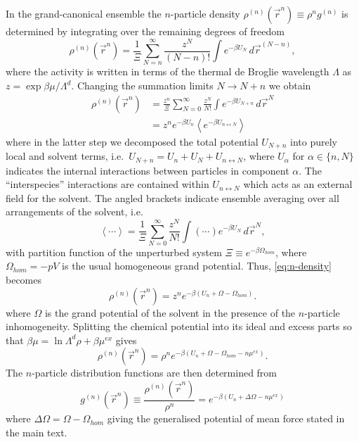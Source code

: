 \documentclass[12pt]{report}
\begin{document}
In the grand-canonical ensemble the $n$-particle density $\rho^{(n)}(\vec{r}^n) \equiv \rho^n g^{(n)}$ is determined by integrating over the remaining degrees of freedom~\cite{Hansen2013}
\begin{equation}
  \rho^{(n)}(\vec{r}^n)
  = \frac{1}{\Xi} \sum_{N=n}^\infty \frac{z^N}{(N-n)!} \int e^{-\beta U_N} \, d\vec{r}^{(N-n)},
\end{equation}
where the activity is written in terms of the thermal de Broglie wavelength $\Lambda$ as $z = \exp{\beta\mu} / \Lambda^d$.
Changing the summation limits $N \rightarrow N+n$ we obtain
\begin{equation}\label{eq:n-density}
\begin{aligned}
  \rho^{(n)}(\vec{r}^n)
  &= \frac{z^n}{\Xi} \sum_{N=0}^\infty \frac{z^N}{N!} \int e^{-\beta U_{N+n}} \, d\vec{r}^{N} \\
 & = z^n e^{-\beta U_n} \left< e^{-\beta U_{n \leftrightarrow N}} \right>
\end{aligned}
\end{equation}
where in the latter step we decomposed the total potential $U_{N+n}$ into purely local and solvent terms, i.e.\ $U_{N+n} = U_n + U_N + U_{n \leftrightarrow N}$, where $U_\alpha$ for $\alpha \in \{n,N\}$ indicates the internal interactions between particles in component $\alpha$.
The ``interspecies'' interactions are contained within $U_{n \leftrightarrow N}$ which acts as an external field for the solvent.
The angled brackets indicate ensemble averaging over all arrangements of the solvent, i.e.\
\begin{equation}
  \left< \cdots \right> =
  \frac{1}{\Xi} \sum_{N=0}^\infty \frac{z^N}{N!} \int \left(\cdots\right) e^{-\beta U_N} \, d\vec{r}^N,
\end{equation}
with partition function of the unperturbed system $\Xi \equiv e^{-\beta \Omega_{hom}}$, where $\Omega_{hom} = -p V$ is the usual homogeneous grand potential.
Thus, \eqref{eq:n-density} becomes
\begin{equation}
  \rho^{(n)}(\vec{r}^n)
  = z^n e^{-\beta (U_n + \Omega - \Omega_{hom})}.
\end{equation}
where $\Omega$ is the grand potential of the solvent in the presence of the $n$-particle inhomogeneity.
Splitting the chemical potential into its ideal and excess parts so that $\beta\mu = \ln{\Lambda^d \rho} + \beta\mu^{ex}$ gives
\begin{equation}
  \rho^{(n)}(\vec{r}^n)
  = \rho^n e^{-\beta (U_n + \Omega - \Omega_{hom} - n\mu^{ex})}.
\end{equation}
The $n$-particle distribution functions are then determined from~\cite{Hansen2013}
\begin{equation}\label{eq:distribution-functions}
  g^{(n)}(\vec{r}^n)
  \equiv \frac{\rho^{(n)}(\vec{r}^n)}{\rho^n}
  = e^{-\beta(U_n + \Delta\Omega - n\mu^{ex})}
\end{equation}
where $\Delta\Omega = \Omega - \Omega_{hom}$ giving the generalised potential of mean force stated in the main text.
\end{document}
